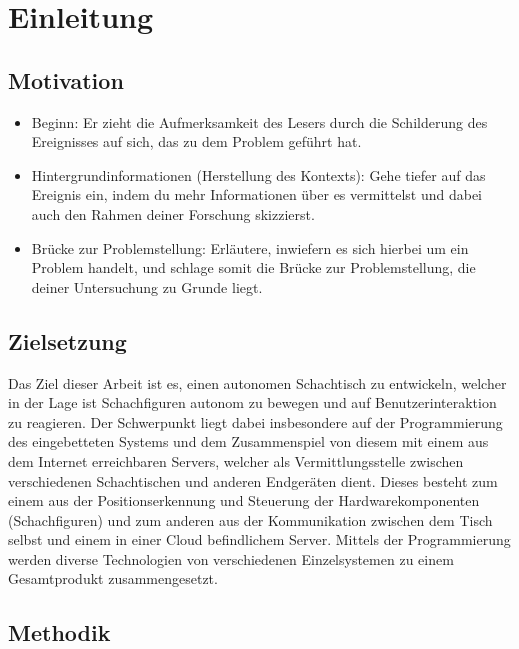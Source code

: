 \hypertarget{einleitung}{%
\section{Einleitung}\label{einleitung}}

\hypertarget{motivation}{%
\subsection{Motivation}\label{motivation}}

\begin{itemize}
\tightlist
\item
  Beginn: Er zieht die Aufmerksamkeit des Lesers durch die Schilderung
  des Ereignisses auf sich, das zu dem Problem geführt hat.
\item
  Hintergrundinformationen (Herstellung des Kontexts): Gehe tiefer auf
  das Ereignis ein, indem du mehr Informationen über es vermittelst und
  dabei auch den Rahmen deiner Forschung skizzierst.
\item
  Brücke zur Problemstellung: Erläutere, inwiefern es sich hierbei um
  ein Problem handelt, und schlage somit die Brücke zur Problemstellung,
  die deiner Untersuchung zu Grunde liegt.
\end{itemize}

\hypertarget{zielsetzung}{%
\subsection{Zielsetzung}\label{zielsetzung}}

Das Ziel dieser Arbeit ist es, einen autonomen Schachtisch zu
entwickeln, welcher in der Lage ist Schachfiguren autonom zu bewegen und
auf Benutzerinteraktion zu reagieren. Der Schwerpunkt liegt dabei
insbesondere auf der Programmierung des eingebetteten Systems und dem
Zusammenspiel von diesem mit einem aus dem Internet erreichbaren
Servers, welcher als Vermittlungsstelle zwischen verschiedenen
Schachtischen und anderen Endgeräten dient. Dieses besteht zum einem aus
der Positionserkennung und Steuerung der Hardwarekomponenten
(Schachfiguren) und zum anderen aus der Kommunikation zwischen dem Tisch
selbst und einem in einer Cloud befindlichem Server. Mittels der
Programmierung werden diverse Technologien von verschiedenen
Einzelsystemen zu einem Gesamtprodukt zusammengesetzt.

\hypertarget{methodik}{%
\subsection{Methodik}\label{methodik}}

